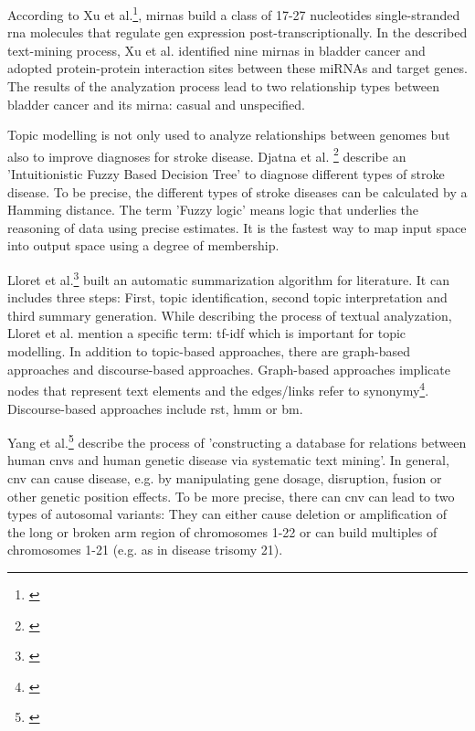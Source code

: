 According to Xu et al.\footnote{\autocite{xu_2013}}, \gls{mirna}s build a class of 17-27 nucleotides single-stranded \gls{rna} molecules that regulate gen expression post-transcriptionally. In the described text-mining process, Xu et al. identified nine \gls{mirna}s in bladder cancer and adopted protein-protein interaction sites between these miRNAs and target genes. The results of the analyzation process lead to two relationship types between bladder cancer and its \gls{mirna}: casual and unspecified. 

Topic modelling is not only used to analyze relationships between genomes but also to improve diagnoses for stroke disease. Djatna et al. \footnote{\autocite{djatna_2018}} describe an 'Intuitionistic Fuzzy Based Decision Tree' to diagnose different types of stroke disease. To be precise, the different types of stroke diseases can be calculated by a Hamming distance. The term 'Fuzzy logic' means logic that underlies the reasoning of data using precise estimates. It is the fastest way to map input space into output space using a degree of membership.

Lloret et al.\footnote{\autocite{lloret_2012}} built an automatic summarization algorithm for literature. It can includes three steps: First, topic identification, second topic interpretation and third summary generation. While describing the process of textual analyzation, Lloret et al. mention a specific term: \gls{tf-idf} which is important for topic modelling. In addition to topic-based approaches, there are graph-based approaches and discourse-based approaches. Graph-based approaches implicate nodes that represent text elements and the edges/links refer to synonymy\footnote{\autocite{lloret_2012}}. Discourse-based approaches include \gls{rst}, \gls{hmm} or \gls{bm}. 

Yang et al.\footnote{\autocite{yang_2018}} describe the process of 'constructing a database for relations between human \gls{cnv}s and human genetic disease via systematic text mining'. In general, \gls{cnv} can cause disease, e.g. by manipulating gene dosage, disruption, fusion or other genetic position effects. 
To be more precise, there can \gls{cnv} can lead to two types of autosomal variants: They can either cause deletion or amplification of the long or broken arm region of chromosomes 1-22 or can build multiples of chromosomes 1-21 (e.g. as in disease trisomy 21). 


